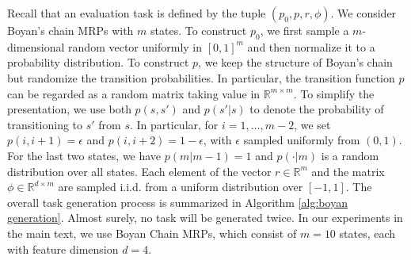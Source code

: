 \documentclass{article}
\newcommand{\fS}{\mathcal{S}}
\newcommand{\R}{\mathbb{R}}
\begin{document}
Recall that an evaluation task is defined by the tuple $(p_0, p, r, \phi)$.
We consider Boyan's chain MRPs with $m$ states.
To construct $p_0$, 
we first sample a $m$-dimensional random vector uniformly in $[0, 1]^m$ and then normalize it to a probability distribution.
To construct $p$,
we keep the structure of Boyan's chain but randomize the transition probabilities.
In particular,
the transition function $p$ can be regarded as a random matrix taking value in $\R^{m \times m}$.
To simplify the presentation,
we use both $p(s, s')$ and $p(s' | s)$ to denote the probability of transitioning to $s'$ from $s$. 
In particular, for $i = 1, \dots, m-2$,
we set $p(i, i+1) = \epsilon$ and $p(i, i+2) = 1 - \epsilon$,
with $\epsilon$ sampled uniformly from $(0, 1)$.
For the last two states, we have
$p(m | m-1) = 1$
and $p(\cdot | m)$ is a random distribution over all states.
Each element of the vector $r \in \R^m$ and the matrix $\phi \in \R^{d \times m}$ are sampled i.i.d. from a uniform distribution over $[-1, 1]$.
The overall task generation process is summarized in Algorithm \ref{alg:boyan generation}.
Almost surely,
no task will be generated twice.
In our experiments in the main text, 
we use Boyan Chain MRPs, which consist of $m = 10$ states, each with feature dimension $d = 4$.  

\end{document}

